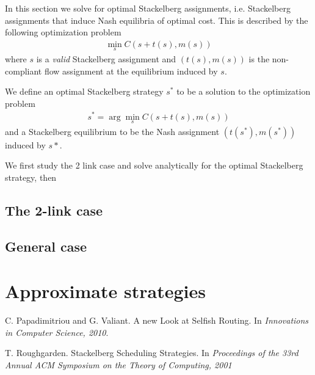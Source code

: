 In this section we solve for optimal Stackelberg assignments, i.e. Stackelberg assignments that induce Nash equilibria of optimal cost. This is described by the following optimization problem
\begin{align*}
\min_s C\left( s + t(s), m(s) \right)
\end{align*}
where $s$ is a \emph{valid} Stackelberg assignment and $(t(s), m(s))$ is the non-compliant flow assignment at the equilibrium induced by $s$.

We define an optimal Stackelberg strategy $s^*$ to be a solution to the optimization problem
\begin{align*}
s^* = \arg \min_s C\left( s + t(s), m(s) \right)
\end{align*}
and a Stackelberg equilibrium to be the Nash assignment $(t(s^*), m(s^*))$ induced by $s*$.


\bigskip
We first study the 2 link case and solve analytically for the optimal Stackelberg strategy, then

\subsection{The 2-link case}

\subsection{General case}



\section{Approximate strategies}


\begin{thebibliography}{8}

  C. Papadimitriou and G. Valiant. A new Look at Selfish Routing. In
  \emph{Innovations in Computer Science, 2010}.

	T. Roughgarden. Stackelberg Scheduling Strategies. In \emph{Proceedings of the 33rd Annual ACM Symposium on the Theory of Computing, 2001}

\end{thebibliography}

